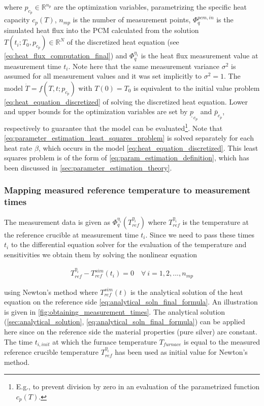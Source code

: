 \documentclass{scrartcl}[12pt, halfparskip]
\numberwithin{equation}{section}
\numberwithin{figure}{section}
\numberwithin{table}{section}
\begin{document}
where $p_{c_p} \in \mathbb{R}^{n_p}$ are the optimization variables, parametrizing the specific heat capacity $c_p(T)$, $n_{{mp}}$ is the number of measurement points, $\varPhi_{q}^{pcm,in}$ is the simulated heat flux into the PCM calculated from the solution $T(t_i;T_0,p_{c_p}) \in \mathbb{R}^N$ of the discretized heat equation (see \cref{eq:heat_flux_computation_final}) and $\varPhi_q^{\eta_i}$ is the heat flux measurement value at measurement time $t_i$. 
Note here that the same measurement variance $\sigma^2$ is assumed for all measurement values and it was set implicitly to $\sigma^2=1$.
The model $\dot{T} = f(T,t;p_{c_p})$ with $T(0) = T_0$ is equivalent to the initial value problem \cref{eq:heat_equation_discretized} of solving the discretized heat equation. Lower and upper bounds for the optimization variables are set by $\underline{p}_{c_p}$ and $\bar{p}_{c_p}$, respectively to guarantee that the model can be evaluated\footnote{E.g., to prevent division by zero in an evaluation of the parametrized function $c_p(T)$.}.
Note that \cref{eq:parameter_estimation_least_squares_problem} is solved separately for each heat rate $\beta$, which occurs in the model \cref{eq:heat_equation_discretized}.
This least squares problem is of the form of \cref{eq:param_estimation_definition}, which has been discussed in \cref{sec:parameter_estimation_theory}.

\subsubsection{Mapping measured reference temperature to measurement times}

The measurement data is given as $\varPhi_q^{\eta_i}(T_{ref}^{\eta_i})$ where $T_{ref}^{\eta_i}$ is the temperature at the reference crucible at measurement time $t_i$. Since we need to pass these times $t_i$ to the differential equation solver for the evaluation of the temperature and sensitivities we obtain them by solving the nonlinear equation 

\begin{align}
	T_{ref}^{\eta_i} - T_{ref}^{sim}(t_i) = 0 \quad \forall \ i = 1,2,...,n_{mp}
	\label{eq:measurement_time_computation}
\end{align}

using Newton's method where $T_{ref}^{sim}(t)$ is the analytical solution of the heat equation on the reference side \cref{eq:analytical_soln_final_formula}. An illustration is given in \cref{fig:obtaining_measurement_times}. The analytical solution (\cref{sec:analytical_solution}, \cref{eq:analytical_soln_final_formula}) can be applied here since on the reference side the material properties (pure silver) are constant. The time $t_{i,init}$ at which the furnace temperature $T_{furnace}$ is equal to the measured reference crucible temperature $T_{ref}^{\eta_i}$ has been used as initial value for Newton's method. 
\end{document}

